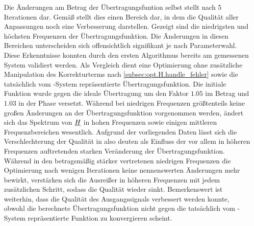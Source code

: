 \documentclass[../Report.tex]{subfiles}
\begin{document}
Die Änderungen am Betrag der Übertragungsfuntion selbst stellt  nach 5 Iterationen dar. Gemäß  stellt dies einen Bereich dar, in dem die Qualität aller Anpassungen noch eine Verbesserung darstellen.
Gezeigt sind die niedrigsten und höchsten Frequenzen der Übertragungsfunktion. Die Änderungen in diesen Bereichen unterscheiden sich offensichtlich signifikant je nach Parameterwahl. 
Diese Erkenntnisse konnten durch den ersten Algorithmus bereits am gemessenen System validiert werden.
Als Vergleich dient eine Optimierung ohne zusätzliche Manipulation des Korrekturterms nach \ref{subsec:opt.H.handle_fehler} sowie die tatsächlich vom \mock-System repräsentierte Übertragungsfunktion.
Die initiale Funktion wurde gegen die ideale Übertragung um den Faktor $1.05$ im Betrag und $1.03$ in der Phase versetzt.
Während bei niedrigen Frequenzen größtenteils keine großen Änderungen an der Übertragungsfunktion vorgenommen werden, ändert sich das Spektrum von $\underline{H}$ in hohen Frequenzen sowie einigen mittleren Frequenzbereichen wesentlich. 
Aufgrund der vorliegenden Daten lässt sich die Verschlechterung der Qualität in  also deuten als Einfluss der vor allem in höheren Frequenzen auftretenden starken Veränderung der Übertragungsfunktion. Während in den betragsmäßig stärker vertretenen niedrigen Frequenzen die Optimierung nach wenigen Iterationen keine nennenswerten Änderungen mehr bewirkt, verstärken sich die Ausreißer in höheren Frequenzen mit jedem zusätzlichen Schritt, sodass die Qualität wieder sinkt. 
Bemerkenswert ist weiterhin, dass die Qualität des Ausgangssignals verbessert werden konnte, obwohl die berechnete Übertragungsfunktion nicht gegen die tatsächlich vom \mock-System repräsentierte Funktion zu konvergieren scheint.


 \Hmock 
{} \Hinit 
{} \HsimpleFive 
{} \HpromFive 
{} \HrmsFive
{} \HzeroFive
\end{document}

